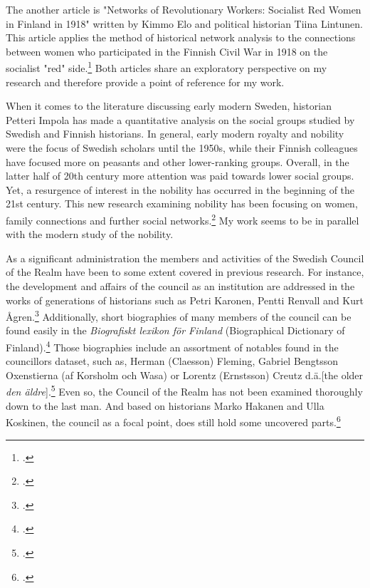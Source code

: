 The another article is "Networks of Revolutionary Workers: Socialist Red Women in Finland in 1918" written by Kimmo Elo and political historian Tiina Lintunen. This article applies the method of historical network analysis to the connections between women who participated in the Finnish Civil War in 1918 on the socialist "red" side.\footcite[Almost the same article is found in Finnish from the \textit{Historiallinen Aikakauskirja} 116 (2/2018).]{LintunenAndElo2019} Both articles share an exploratory perspective on my research and therefore provide a point of reference for my work. 

When it comes to the literature discussing early modern Sweden, historian Petteri Impola has made a quantitative analysis on the social groups studied by Swedish and Finnish historians. In general, early modern royalty and nobility were the focus of Swedish scholars until the 1950s, while their Finnish colleagues have focused more on peasants and other lower-ranking groups. Overall, in the latter half of 20th century more attention was paid towards lower social groups. Yet, a resurgence of interest in the nobility has occurred in the beginning of the 21st century. This new research examining nobility has been focusing on women, family connections and further social networks.\footcite[see also \textit{Aatelin historia Suomessa}(2020) by Alex Snellman, Anu Lahtinen, Janne Haikari and Marko Hakanen]{impola2024} My work seems to be in parallel with the modern study of the nobility.

As a significant administration the members and activities of the Swedish Council of the Realm have been to some extent covered in previous research. For instance, the development and affairs of the council as an institution are addressed in the works of generations of historians such as Petri Karonen, Pentti Renvall and Kurt Ågren.\footcites{pSuurvalta}[See e. g. Pentti Renvall "Keskitetyn hallintolaitoksen kehitys" in \textit{Suomen kulttuurihistoria. II} (1934) or Kurt Ågren "Rise and decline of an aristocracy: The Swedish social and political elite in the 17th century" in the \textit{Scandinavian journal of history} (1976).]{hopesAndFearsCouncil} Additionally, short biographies of many members of the council can be found easily in the \textit{Biografiskt lexikon för Finland} (Biographical Dictionary of Finland).\footcite{blf} Those biographies include an assortment of notables found in the councillors dataset, such as, Herman (Claesson) Fleming, Gabriel Bengtsson Oxenstierna (af Korsholm och Wasa) or Lorentz (Ernstsson) Creutz d.ä.[the older \textit{den äldre}].\footcite{blf-list} Even so, the Council of the Realm has not been examined thoroughly down to the last man. And based on historians Marko Hakanen and Ulla Koskinen, the council as a focal point, does still hold some uncovered parts.\footcite[pp. 47-48.]{HakanenAKoskinen2017} 

